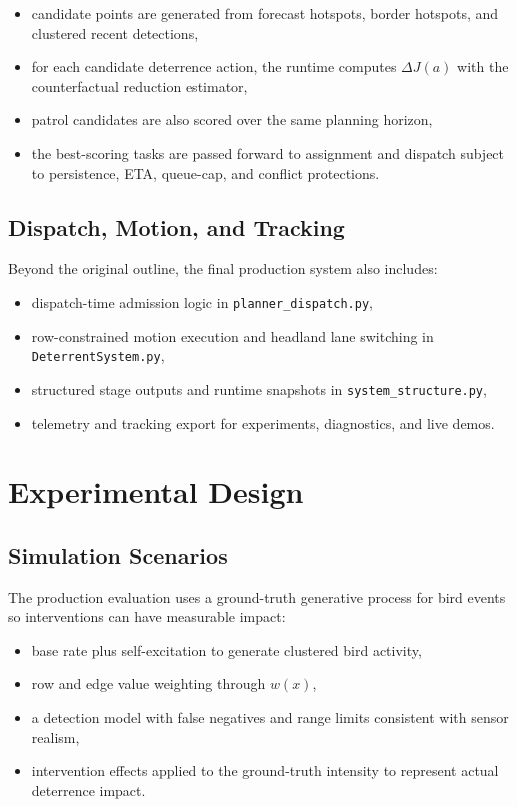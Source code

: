 \begin{itemize}
\item candidate points are generated from forecast hotspots, border hotspots, and clustered recent detections,
\item for each candidate deterrence action, the runtime computes $\Delta J(a)$ with the counterfactual reduction estimator,
\item patrol candidates are also scored over the same planning horizon,
\item the best-scoring tasks are passed forward to assignment and dispatch subject to persistence, ETA, queue-cap, and conflict protections.
\end{itemize}

\subsection{Dispatch, Motion, and Tracking}

Beyond the original outline, the final production system also includes:

\begin{itemize}
\item dispatch-time admission logic in \texttt{planner\_dispatch.py},
\item row-constrained motion execution and headland lane switching in \texttt{DeterrentSystem.py},
\item structured stage outputs and runtime snapshots in \texttt{system\_structure.py},
\item telemetry and tracking export for experiments, diagnostics, and live demos.
\end{itemize}

\section{Experimental Design}

\subsection{Simulation Scenarios}

The production evaluation uses a ground-truth generative process for bird events so interventions can have measurable impact:

\begin{itemize}
\item base rate plus self-excitation to generate clustered bird activity,
\item row and edge value weighting through $w(x)$,
\item a detection model with false negatives and range limits consistent with sensor realism,
\item intervention effects applied to the ground-truth intensity to represent actual deterrence impact.
\end{itemize}

